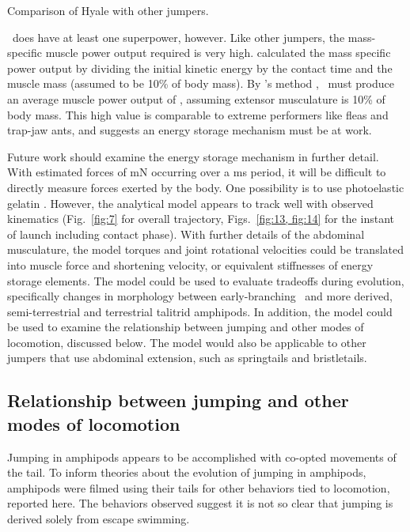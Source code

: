 \documentclass{jeb}
\newcommand{\Hyale}{\Genus{H.~pugettensis}}
\begin{document}
\begin{table}
\caption{Comparison of Hyale with other jumpers.}
\label{table:6}
\end{table}
	
\Hyale\ does have at least one superpower, however.  Like other jumpers, the mass-specific muscle power output required is very high.  \citet{Bennet-Clark:1975} calculated the mass specific power output by dividing the initial kinetic energy by the contact time and the muscle mass (assumed to be 10\% of body mass).  By \citeauthor{Bennet-Clark:1975}'s method \citeyear{Bennet-Clark:1975}, \Hyale\ must produce an average muscle power output of , assuming extensor musculature is 10\% of body mass.  This high value is comparable to extreme performers like fleas and trap-jaw ants, and suggests an energy storage mechanism must be at work.  
	
Future work should examine the energy storage mechanism in further detail.  With estimated forces of \unit[1]{mN} occurring over a \unit[3]{ms} period, it will be difficult to directly measure forces exerted by the body.  One possibility is to use photoelastic gelatin \citep{Full:1995}.   However, the analytical model appears to track well with observed kinematics (Fig.~\ref{fig:7} for overall trajectory, Figs.~\ref{fig:13, fig:14} for the instant of launch including contact phase).  With further details of the abdominal musculature, the model torques and joint rotational velocities could be translated into muscle force and shortening velocity, or equivalent stiffnesses of energy storage elements.  The model could be used to evaluate tradeoffs during evolution, specifically changes in morphology between early-branching \Hyale\ and more derived, semi-terrestrial and terrestrial talitrid amphipods.  In addition, the model could be used to examine the relationship between jumping and other modes of locomotion, discussed below.  The model would also be applicable to other jumpers that use abdominal extension, such as springtails and bristletails. 
	
\subsection{Relationship between jumping and other modes of locomotion}
Jumping in amphipods appears to be accomplished with co-opted movements of the tail.  To inform theories about the evolution of jumping in amphipods, amphipods were filmed using their tails for other behaviors tied to locomotion, reported here.  The behaviors observed suggest it is not so clear that jumping is derived solely from escape swimming. 
	
\end{document}
